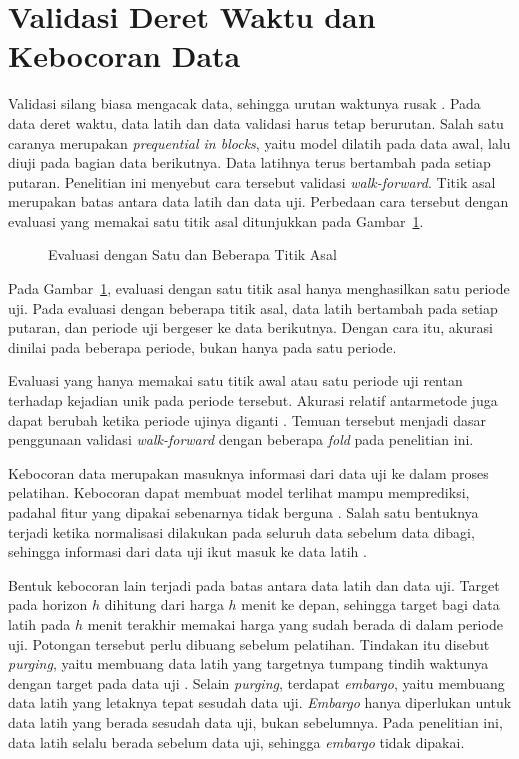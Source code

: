 \section{Validasi Deret Waktu dan Kebocoran Data}
\label{sec:validasi}
Validasi silang biasa mengacak data, sehingga urutan waktunya rusak
\cite{cerqueira2020}. Pada data deret waktu, data latih dan data validasi
harus tetap berurutan. Salah satu caranya merupakan \textit{prequential in
blocks}, yaitu model dilatih pada data awal, lalu diuji pada bagian data berikutnya. Data latihnya terus bertambah pada setiap putaran. Penelitian ini
menyebut cara tersebut validasi \textit{walk-forward}. Titik asal merupakan batas
antara data latih dan data uji. Perbedaan cara tersebut dengan evaluasi yang
memakai satu titik asal ditunjukkan pada Gambar~\ref{fig:asal}.

\begin{figure}[!htbp]
  \centering
  \caption[Evaluasi dengan Satu dan Beberapa Titik Asal]{Evaluasi dengan
    Satu dan Beberapa Titik Asal \cite{tashman2000,cerqueira2020}}
  \label{fig:asal}
\end{figure}

Pada Gambar~\ref{fig:asal}, evaluasi dengan satu titik asal hanya
menghasilkan satu periode uji. Pada evaluasi dengan beberapa titik asal, data
latih bertambah pada setiap putaran, dan periode uji bergeser ke data
berikutnya. Dengan cara itu, akurasi dinilai pada beberapa periode, bukan
hanya pada satu periode.

Evaluasi yang hanya memakai satu titik awal atau satu periode uji rentan
terhadap kejadian unik pada periode tersebut. Akurasi
relatif antarmetode juga dapat berubah ketika periode ujinya diganti
\cite{tashman2000}. Temuan tersebut menjadi dasar penggunaan validasi
\textit{walk-forward} dengan beberapa \textit{fold} pada penelitian ini.

Kebocoran data merupakan masuknya informasi dari data uji ke dalam proses
pelatihan. Kebocoran dapat membuat model terlihat mampu memprediksi, padahal
fitur yang dipakai sebenarnya tidak berguna \cite{lopezdeprado2018}. Salah
satu bentuknya terjadi ketika normalisasi dilakukan pada seluruh data sebelum
data dibagi, sehingga informasi dari data uji ikut masuk ke data latih
\cite{rodrigues2025}.

Bentuk kebocoran lain terjadi pada batas antara data latih dan data uji. Target
pada horizon $h$ dihitung dari harga $h$ menit ke depan, sehingga target bagi
data latih pada $h$ menit terakhir memakai harga yang sudah berada di dalam periode
uji. Potongan tersebut perlu dibuang sebelum pelatihan. Tindakan itu disebut
\textit{purging}, yaitu membuang data latih yang targetnya tumpang tindih
waktunya dengan target pada data uji \cite{lopezdeprado2018}.
Selain \textit{purging}, terdapat \textit{embargo}, yaitu membuang data latih
yang letaknya tepat sesudah data uji. \textit{Embargo} hanya diperlukan untuk
data latih yang berada sesudah data uji, bukan sebelumnya. Pada penelitian
ini, data latih selalu berada sebelum data uji, sehingga \textit{embargo}
tidak dipakai.


